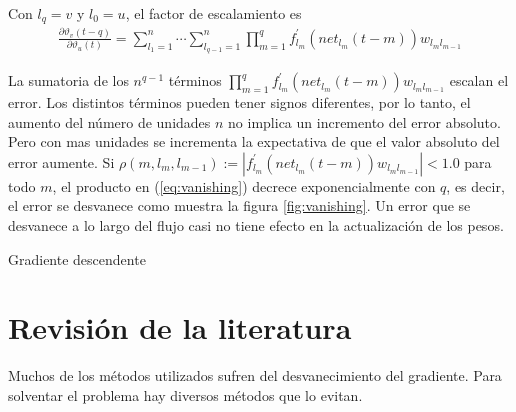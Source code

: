 Con $l_{q} = v$ y $l_{0} = u$, el factor de escalamiento es
\begin{eqnarray}
\frac{\partial\vartheta_{v}(t - q)}{\partial\vartheta_{u}(t)} =
\sum^{n}_{l_{1}=1}\cdots\sum^{n}_{l_{q - 1}=1}\prod^{q}_{m = 1}f^{'}_{l_{m}}(net_{l_{m}}(t - m))w_{l_{m}l_{m - 1}}\label{eq:vanishing}
\end{eqnarray}

La sumatoria de los $n^{q - 1}$ términos $\prod^{q}_{m = 1}f^{'}_{l_{m}}(net_{l_{m}}(t - m))w_{l_{m}l_{m - 1}}$ escalan el error. Los distintos términos pueden tener signos diferentes, por lo tanto, el aumento del número de unidades $n$ no implica un incremento del error absoluto. Pero con mas unidades se incrementa la expectativa de que el valor absoluto del error aumente. Si $\rho(m, l_{m}, l_{m - 1}) := |f^{'}_{l_{m}}(net_{l_{m}}(t - m))w_{l_{m}l_{m - 1}}| < 1.0$
para todo $m$, el producto en (\ref{eq:vanishing}) decrece exponencialmente con $q$, es decir, el error se desvanece como muestra la figura \ref{fig:vanishing}. Un error que se desvanece a lo largo del flujo casi no tiene efecto en la actualización de los pesos. %

\begin{imagen}
	\scalebox{1.0}{}
	\label{fig:vanishing}
	\caption{Gradiente descendente}
\end{imagen}

\section{Revisión de la literatura}
Muchos de los métodos utilizados \cite{Elman1990, Schmidhuber1992b, Pearlmutter1989, Pearlmutter1995} sufren del desvanecimiento del gradiente. Para solventar el problema hay diversos métodos que lo evitan.



